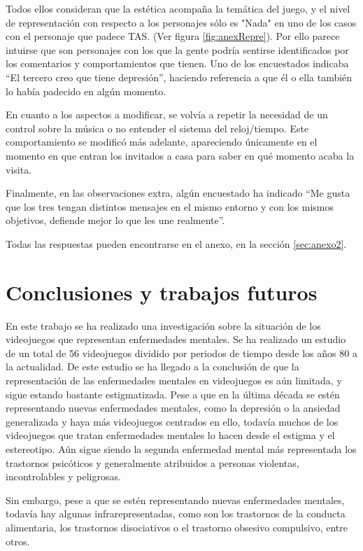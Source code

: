 \documentclass[12pt, a4paper,twoside,titlepage]{book}
\begin{document}
Todos ellos consideran que la estética acompaña la temática del juego, y el nivel de representación con respecto a los personajes sólo es "Nada" en uno de los casos con el personaje que padece TAS. (Ver figura \ref{fig:anexRepre}). Por ello parece intuirse que son personajes con los que la gente podría sentirse identificados por los comentarios y comportamientos que tienen. Uno de los encuestados indicaba ``El tercero creo que tiene depresión'', haciendo referencia a que él o ella también lo había padecido en algún momento. 

En cuanto a los aspectos a modificar, se volvía a repetir la necesidad de un control sobre la música o no entender el sistema del reloj/tiempo. Este comportamiento se modificó más adelante, apareciendo únicamente en el momento en que entran los invitados a casa para saber en qué momento acaba la visita. 

Finalmente, en las observaciones extra, algún encuestado ha indicado ``Me gusta que los tres tengan distintos mensajes en el mismo entorno y con los mismos objetivos, defiende mejor lo que les une realmente''. 

Todas las respuestas pueden encontrarse en el anexo, en la sección \ref{sec:anexo2}. 

\chapter{Conclusiones y trabajos futuros}

En este trabajo se ha realizado una investigación sobre la situación de los videojuegos que representan enfermedades mentales. Se ha realizado un estudio de un total de 56 videojuegos dividido por periodos de tiempo desde los años 80 a la actualidad. De este estudio se ha llegado a la conclusión de que la representación de las enfermedades mentales en videojuegos es aún limitada, y sigue estando bastante estigmatizada. Pese a que en la última década se estén representando nuevas enfermedades mentales, como la depresión o la ansiedad generalizada y haya más videojuegos centrados en ello, todavía muchos de los videojuegos que tratan enfermedades mentales lo hacen desde el estigma y el estereotipo. Aún sigue siendo la segunda enfermedad mental más representada los trastornos psicóticos y generalmente atribuidos a personas violentas, incontrolables y peligrosas. 

Sin embargo, pese a que se estén representando nuevas enfermedades mentales, todavía hay algunas infrarepresentadas, como son los trastornos de la conducta alimentaria, los trastornos disociativos o el trastorno obsesivo compulsivo, entre otros. 
\end{document}
